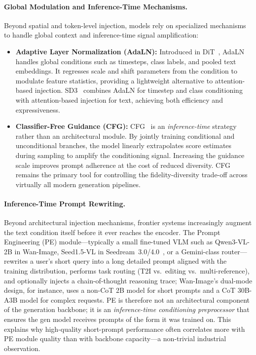 \documentclass{llmxive}
\begin{document}
\paragraph{Global Modulation and Inference-Time Mechanisms.}
Beyond spatial and token-level injection, models rely on specialized mechanisms to handle global context and inference-time signal amplification:
\begin{itemize}
    \item \textbf{Adaptive Layer Normalization (AdaLN):} Introduced in DiT~\citep{peebles2023scalable}, AdaLN handles global conditions such as timesteps, class labels, and pooled text embeddings. It regresses scale and shift parameters from the condition to modulate feature statistics, providing a lightweight alternative to attention-based injection. SD3~\citep{esser2024stablediffusion3} combines AdaLN for timestep and class conditioning with attention-based injection for text, achieving both efficiency and expressiveness.
    \item \textbf{Classifier-Free Guidance (CFG):} CFG~\citep{ho2022classifier} is an \emph{inference-time} strategy rather than an architectural module. By jointly training conditional and unconditional branches, the model linearly extrapolates score estimates during sampling to amplify the conditioning signal. Increasing the guidance scale improves prompt adherence at the cost of reduced diversity. CFG remains the primary tool for controlling the fidelity-diversity trade-off across virtually all modern generation pipelines.
\end{itemize}

\paragraph{Inference-Time Prompt Rewriting.} Beyond architectural injection mechanisms, frontier systems increasingly augment the text condition itself before it ever reaches the encoder. The Prompt Engineering (PE) module---typically a small fine-tuned VLM such as Qwen3-VL-2B in Wan-Image, Seed1.5-VL in Seedream~3.0/4.0~\citep{gao2025seedream,seedream2025seedream}, or a Gemini-class router---rewrites a user's short query into a long detailed prompt aligned with the training distribution, performs task routing (T2I vs.\ editing vs.\ multi-reference), and optionally injects a chain-of-thought reasoning trace; Wan-Image's dual-mode design, for instance, uses a non-CoT 2B model for short prompts and a CoT 30B-A3B model for complex requests. PE is therefore not an architectural component of the generation backbone; it is an \emph{inference-time conditioning preprocessor} that ensures the gen model receives prompts of the form it was trained on. This explains why high-quality short-prompt performance often correlates more with PE module quality than with backbone capacity---a non-trivial industrial observation.
\end{document}
